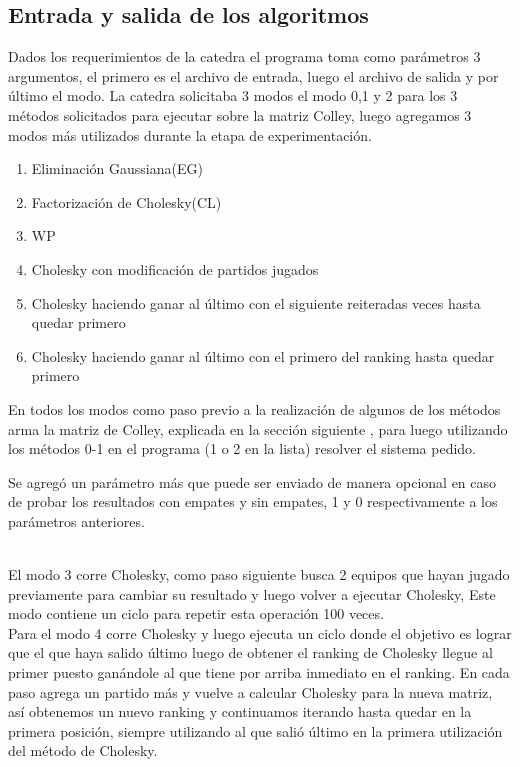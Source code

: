\subsection{Entrada y salida de los algoritmos}

Dados los requerimientos de la catedra el programa toma como parámetros 3 argumentos, el primero es el archivo de entrada, luego el archivo de salida y
por \'ultimo el modo.  La catedra solicitaba 3 modos el modo 0,1 y 2 para los 3 métodos solicitados para ejecutar sobre la matriz Colley, luego agregamos 3 modos m\'as utilizados durante la etapa de experimentación.
\\
\begin{enumerate}
    \item Eliminaci\'on Gaussiana(EG)
    \item Factorizaci\'on de Cholesky(CL)
    \item WP
    \item Cholesky con modificación de partidos jugados
    \item Cholesky haciendo ganar al \'ultimo con el siguiente reiteradas veces hasta quedar primero
    \item Cholesky haciendo ganar al \'ultimo con el primero del ranking hasta quedar primero
\end{enumerate}
En todos los modos como paso previo a la realización de algunos de los métodos arma la matriz de Colley, explicada en la sección siguiente , para luego utilizando los métodos 0-1 en el programa (1 o 2 en la lista) resolver el sistema pedido.

Se agregó un parámetro más que puede ser enviado de manera opcional en caso de probar los resultados con empates y sin empates, 1 y 0 respectivamente a los parámetros anteriores.

\\

El modo 3 corre Cholesky, como paso siguiente busca 2 equipos que hayan jugado previamente para cambiar su resultado y luego volver a ejecutar Cholesky,
Este modo contiene un ciclo para repetir esta operación 100 veces.
\\
Para el modo 4 corre Cholesky y luego ejecuta un ciclo donde el objetivo es lograr que el que haya salido \'ultimo luego de obtener el ranking de Cholesky llegue al primer puesto ganándole
al que tiene por arriba inmediato en el ranking. En cada paso agrega un partido m\'as y vuelve a calcular Cholesky para la nueva matriz, así obtenemos un nuevo ranking y continuamos iterando hasta quedar en la primera posición,
siempre utilizando al que salió último en la primera utilización del método de Cholesky.

